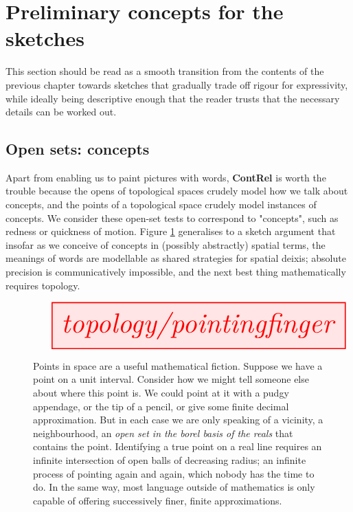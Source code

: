\section{Preliminary concepts for the sketches}\label{sec:prelims}

This section should be read as a smooth transition from the contents of the previous chapter towards sketches that gradually trade off rigour for expressivity, while ideally being descriptive enough that the reader trusts that the necessary details can be worked out.

\subsection{Open sets: concepts}

Apart from enabling us to paint pictures with words, \textbf{ContRel} is worth the trouble because the opens of topological spaces crudely model how we talk about concepts, and the points of a topological space crudely model instances of concepts. We consider these open-set tests to correspond to "concepts", such as redness or quickness of motion. Figure \ref{fig:pointing} generalises to a sketch argument that insofar as we conceive of concepts in (possibly abstractly) spatial terms, the meanings of words are modellable as shared strategies for spatial deixis; absolute precision is communicatively impossible, and the next best thing mathematically requires topology.

\begin{figure}[h!]\label{fig:pointing}
\[\resizebox{\textwidth}{!}{\tikzfig{topology/pointingfinger}}\]
\caption{Points in space are a useful mathematical fiction. Suppose we have a point on a unit interval. Consider how we might tell someone else about where this point is. We could point at it with a pudgy appendage, or the tip of a pencil, or give some finite decimal approximation. But in each case we are only speaking of a vicinity, a neighbourhood, an \emph{open set in the borel basis of the reals} that contains the point. Identifying a true point on a real line requires an infinite intersection of open balls of decreasing radius; an infinite process of pointing again and again, which nobody has the time to do. In the same way, most language outside of mathematics is only capable of offering successively finer, finite approximations.}
\end{figure}

